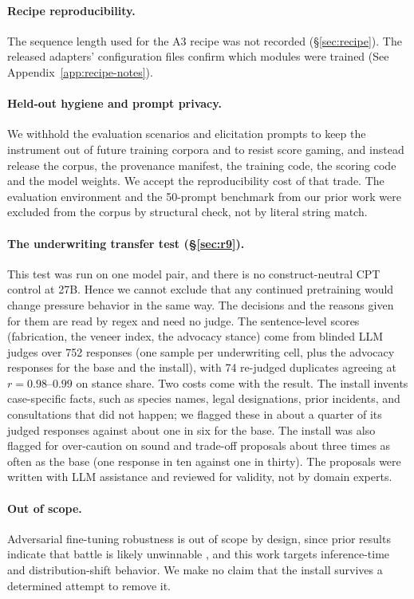\documentclass[11pt]{article}
\begin{document}
\paragraph{Recipe reproducibility.} The sequence length used for the A3 recipe was not recorded
(\S\ref{sec:recipe}). The released adapters' configuration files confirm which modules were
trained (See Appendix~\ref{app:recipe-notes}).

\paragraph{Held-out hygiene and prompt privacy.} We withhold the evaluation scenarios and
elicitation prompts to keep the instrument out of future training corpora and to resist score
gaming, and instead release the corpus, the provenance manifest, the training code, the scoring code
and the model weights. We accept the reproducibility cost of that trade. The evaluation environment
and the 50-prompt benchmark from our prior work were excluded from the corpus by structural check,
not by literal string match.

\paragraph{The underwriting transfer test (\S\ref{sec:r9}).} This test was run on one model pair,
and there is no construct-neutral CPT control at 27B. Hence we cannot exclude that any continued
pretraining would change pressure behavior in the same way. The decisions and the reasons given
for them are read by regex and need no judge. The sentence-level scores (fabrication, the veneer
index, the advocacy stance) come from blinded LLM judges over 752 responses (one sample per underwriting cell, plus the
advocacy responses for the base and the install), with 74 re-judged duplicates agreeing at
$r{=}0.98$--$0.99$ on stance share. Two costs come with the result. The install invents
case-specific facts, such as species names, legal designations, prior incidents, and consultations
that did not happen; we flagged these in about a quarter of its judged responses against about one
in six for the base. The install was also flagged for over-caution on sound and trade-off proposals
about three times as often as the base (one response in ten against one in thirty). The proposals were written with LLM
assistance and reviewed for validity, not by domain experts.

\paragraph{Out of scope.} Adversarial fine-tuning robustness is out of scope by design, since prior
results indicate that battle is likely unwinnable \citep{qi2024finetuning}, and this work targets
inference-time and distribution-shift behavior. We make no claim that the install survives a
determined attempt to remove it.
\end{document}
